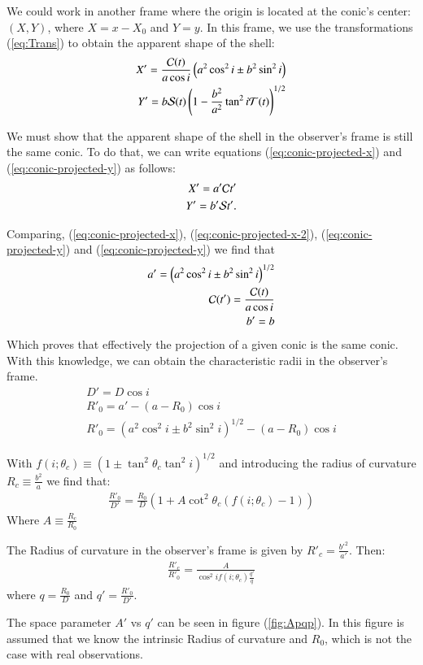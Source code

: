 We could work in another frame where the origin is located at the conic's center: $(X,Y)$, where $X=x-X_0$ and $Y=y$.
In this frame,  we use the transformations (\ref{eq:Trans})  to obtain the apparent shape of the shell:
\begin{align}
X' = \frac{\mathcal{C}(t)}{a\cos i}\left(a^2\cos^2 i \pm b^2\sin^2 i\right)  \label{eq:conic-projected-x}\\
Y'= b\mathcal{S}(t)\left(1-\frac{b^2}{a^2}\tan^2 i\mathcal{T}(t)\right)^{1/2}
\label{eq:conic-projected-y}
\end{align}


We must show that the apparent shape of the shell in the observer's frame is still the same conic. To do that, we can write equations
(\ref{eq:conic-projected-x}) and (\ref{eq:conic-projected-y}) as follows:
\begin{align}
X' = a'\mathcal{C} t' \label{eq:conic-projected-x-2} \\
Y' = b'\mathcal{S} t' \label{eq:conic-projected-y-2} . 
\end{align}

Comparing, (\ref{eq:conic-projected-x}), (\ref{eq:conic-projected-x-2}), (\ref{eq:conic-projected-y}) and (\ref{eq:conic-projected-y}) we find that
\begin{align}
a' = \left(a^2\cos^2 i \pm b^2\sin^2 i\right)^{1/2} \\
\mathcal{C}(t') = \frac{\mathcal{C}(t)}{a\cos i} \\
b' = b
\end{align} 
Which proves that effectively the projection of a given conic is the same conic. With this knowledge, we can obtain the characteristic radii in
the observer's frame.
\begin{align}
D' = D\cos i \\
R'_0 = a' - (a-R_0)\cos i \\
R'_0 = \left(a^2\cos^2 i \pm b^2\sin^2 i\right)^{1/2}  - (a-R_0)\cos i
\end{align}

With  $f(i;\theta_c)\equiv\left(1\pm\tan^2\theta_c\tan^2i\right)^{1/2}$ and introducing the
radius of curvature $R_c\equiv \frac{b^2}{a}$ we find that:
\begin{align}
\frac{R'_0}{D'}=\frac{R_0}{D}\left(1+A\cot^2\theta_c(f(i;\theta_c)-1) \right)
\end{align}
Where $A\equiv \frac{R_c}{R_0}$

The Radius of curvature in the observer's frame is given by $R'_c=\frac{b'^2}{a'}$. Then:
\begin{align}
\frac{R'_c}{R'_0} = \frac{A}{\cos^2 i f(i;\theta_c)\frac{q'}{q}}
\end{align}
where $q=\frac{R_0}{D}$ and $q' = \frac{R'_0}{D'}$. 

The space parameter $A'$ vs $q'$ can be seen in figure (\ref{fig:Apqp}). In this figure is assumed that we know the intrinsic Radius of curvature and $R_0$, which is not the case with
real observations.

 

